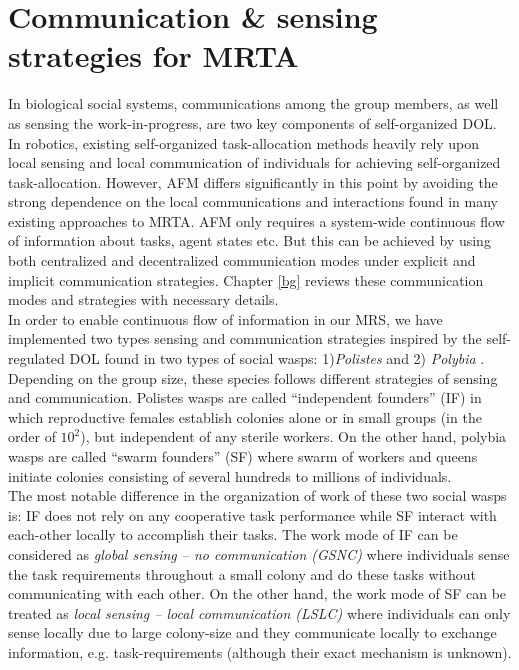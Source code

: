 \section{Communication \& sensing strategies for MRTA}
In biological social systems, communications among the group members, as well as sensing the work-in-progress, are two key components of self-organized DOL. In robotics, existing self-organized task-allocation methods heavily rely upon local  sensing and local communication of individuals for achieving self-organized task-allocation. However,  AFM differs significantly in this point by avoiding the strong dependence on the local communications and interactions found in many existing approaches to MRTA. AFM only requires a system-wide continuous flow of information about tasks, agent states etc. But this can be achieved by using both centralized and decentralized communication modes under explicit and implicit communication strategies. Chapter \ref{bg} reviews these communication modes and strategies with necessary details.\\
In order to enable continuous flow of information in our MRS, we have implemented two types sensing and communication strategies inspired by the self-regulated DOL found in two types of social wasps: 1){\em Polistes} and 2)  {\em Polybia} \cite{Jeanne1999}. Depending on the group size, these species follows different strategies of sensing and communication.   Polistes wasps are called  ``independent founders'' (IF) in which reproductive females establish colonies alone or in small groups (in the order of $10^2$), but independent of any sterile workers. On the other hand, polybia wasps are called ``swarm founders'' (SF) where swarm of workers and queens initiate colonies consisting of several hundreds to millions of individuals.\\
The most notable difference in the organization of work of these two social wasps is: IF does not rely on any cooperative task performance while SF interact with each-other locally to accomplish their tasks. The work mode of IF can be considered as {\em global sensing – no communication (GSNC)} where individuals sense the task requirements throughout a small colony and do these tasks without communicating with each other. On the other hand, the work mode of SF can be treated as {\em local sensing – local communication (LSLC)} where individuals can only sense locally due to large colony-size and they communicate locally to exchange information, e.g. task-requirements (although their exact mechanism is unknown).\\
